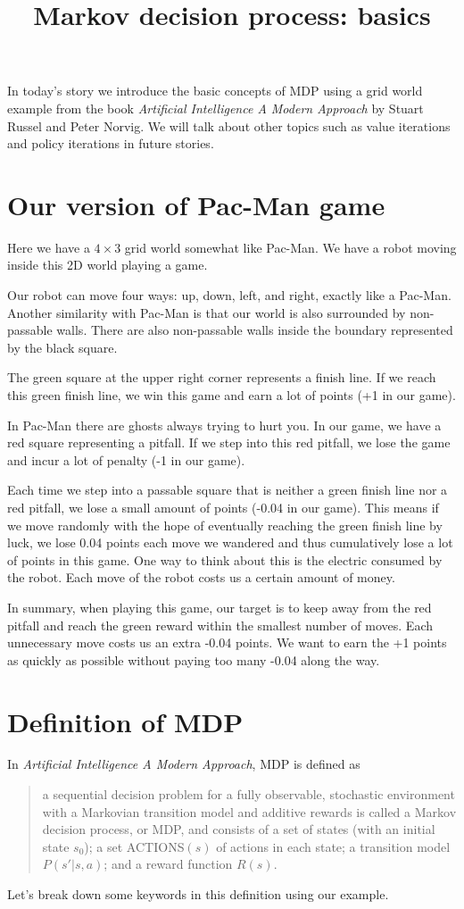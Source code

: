 \documentclass[
	letterpaper
]{article}
\title{Markov decision process: basics}
\date{}
\begin{document}
\maketitle

In today's story we  introduce the basic concepts of MDP using a grid world example from the book \textit{Artificial Intelligence A Modern Approach} by Stuart Russel and Peter Norvig.
We will talk about other topics such as value iterations and policy iterations in future stories.

\section{Our version of Pac-Man game}
Here we have a $4\times3$ grid world somewhat like Pac-Man.
We have a robot moving inside this 2D world playing a game.

Our robot can move four ways: up, down, left, and right, exactly like a Pac-Man.
Another similarity with Pac-Man is that our world is also surrounded by non-passable walls.
There are also non-passable walls inside the boundary represented by the black square.

The green square at the upper right corner represents a finish line.
If we reach this green finish line, we win this game and earn a lot of points (+1 in our game).

In Pac-Man there are ghosts always trying to hurt you.
In our game, we have a red square representing a pitfall.
If we step into this red pitfall, we lose the game and incur a lot of penalty (-1 in our game).

Each time we step into a passable square that is neither a green finish line nor a red pitfall, we lose a small amount of points (-0.04 in our game).
This means if we move randomly with the hope of eventually reaching the green finish line by luck, we lose 0.04 points each move we wandered and thus cumulatively lose a lot of points in this game.
One way to think about this is the electric consumed by the robot.
Each move of the robot costs us a certain amount of money.

In summary, when playing this game, our target is to keep away from the red pitfall and reach the green reward within the smallest number of moves.
Each unnecessary move costs us an extra -0.04 points.
We want to earn the +1 points as quickly as possible without paying too many -0.04 along the way.

\section{Definition of MDP}
In \textit{Artificial Intelligence A Modern Approach}, MDP is defined as 
\begin{quote}
a sequential decision problem for a fully observable, stochastic environment with a Markovian transition model and additive rewards is called a Markov decision process, or MDP, and consists of a set of states (with an initial state $s_0$); a set ACTIONS$(s)$ of actions in each state; a transition model $P(s'| s, a)$; and a reward function $R(s)$.
\end{quote}
Let's break down some keywords in this definition using our example.
\end{document}
